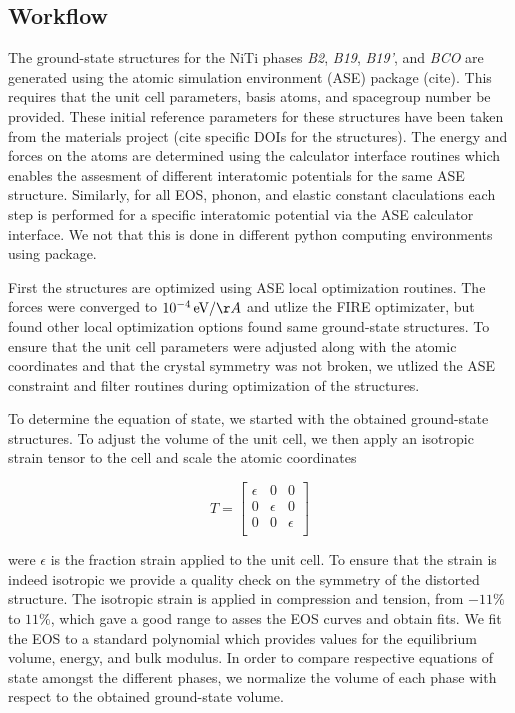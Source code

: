 \documentclass[preprint]{elsarticle}
\begin{document}
\subsection{Workflow}
\label{sec:workflow}
The ground-state structures for the NiTi phases \textit{B2}, \textit{B19}, \textit{B19'}, and \textit{BCO} are generated using the atomic simulation environment (ASE) package (cite). This requires that the unit cell parameters, basis atoms, and spacegroup number be provided. These initial reference parameters for these structures have been taken from the materials project (cite specific DOIs for the structures). The energy and forces on the atoms are determined using the calculator interface routines which enables the assesment of different interatomic potentials for the same ASE structure. Similarly, for all EOS, phonon, and elastic constant claculations each step is performed for a specific interatomic potential via the ASE calculator interface. We not that this is done in different python computing environments using \href{https://github.com/showyourwork/showyourwork}{\showyourwork} package.\par

First the structures are optimized using ASE local optimization routines. The forces were converged to $10^{-4}\,\text{eV}/\AA$ and utlize the FIRE optimizater, but found other local optimization options found same ground-state structures. To ensure that the unit cell parameters were adjusted along with the atomic coordinates and that the crystal symmetry was not broken, we utlized the ASE constraint and filter routines during optimization of the structures. \par

To determine the equation of state, we started with the obtained ground-state structures. To adjust the volume of the unit cell, we then apply an isotropic strain tensor to the cell and scale the atomic coordinates

\begin{equation}
  \label{eq:isotropic_strain}
  T=\begin{bmatrix}
    \epsilon & 0 & 0 \\
    0 & \epsilon & 0 \\
    0 & 0 & \epsilon \\
  \end{bmatrix}
\end{equation}


were $\epsilon$ is the fraction strain applied to the unit cell. To ensure that the strain is indeed isotropic we provide a quality check on the symmetry of the distorted structure. The isotropic strain is applied in compression and tension, from $-11\%$ to $11\%$, which gave a good range to asses the EOS curves and obtain fits. We fit the EOS to a standard polynomial which provides values for the equilibrium volume, energy, and bulk modulus. In order to compare respective equations of state amongst the different phases, we normalize the volume of each phase with respect to the obtained ground-state volume. \par
\end{document}
